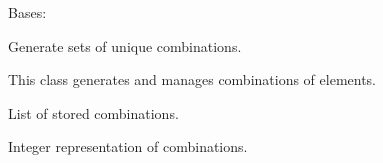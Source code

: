 \documentclass[letterpaper,12pt,english]{sphinxmanual}
\begin{document}
\begin{fulllineitems}
\label{\detokenize{api/core:cbmpy.CBCommon.ComboGen}}
\pysigstartsignatures
\pysigline
{}
\pysigstopsignatures
\sphinxAtStartPar
Bases: 

\sphinxAtStartPar
Generate sets of unique combinations.

\sphinxAtStartPar
This class generates and manages combinations of elements.

\begin{fulllineitems}
\label{\detokenize{api/core:cbmpy.CBCommon.ComboGen.combo}}
\pysigstartsignatures
\pysigline
{}
\pysigstopsignatures
\sphinxAtStartPar
List of stored combinations.
\begin{quote}\begin{description}
\sphinxAtStartPar
{}

\end{description}\end{quote}

\end{fulllineitems}


\begin{fulllineitems}
\label{\detokenize{api/core:cbmpy.CBCommon.ComboGen.combo_int}}
\pysigstartsignatures
\pysigline
{}
\pysigstopsignatures
\sphinxAtStartPar
Integer representation of combinations.
\begin{quote}\begin{description}
\sphinxAtStartPar
{}

\end{description}\end{quote}

\end{fulllineitems}


\end{fulllineitems}
\end{document}
